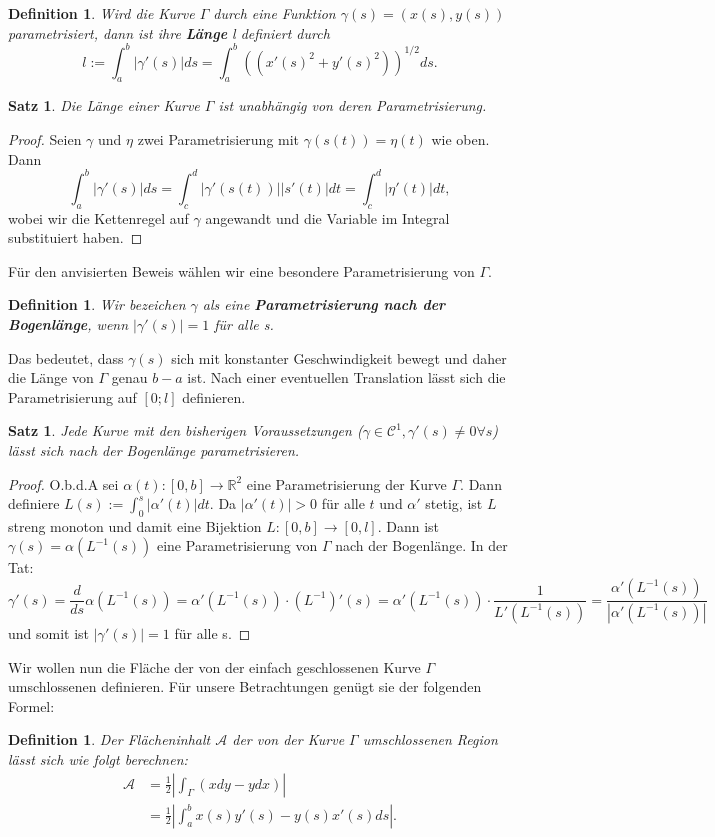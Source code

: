 \documentclass[12pt,a4paper]{article}
\theoremstyle{plain}
\newtheorem{Satz}[Theorem]{Satz}
\newtheorem{Definition}[Theorem]{Definition}
\newcommand{\herv}[1]{{\emph{\textbf{#1}}}}
\newcommand{\R}{\mathbb{R}}
\numberwithin{equation}{section}
\begin{document}
\begin{Definition}
Wird die Kurve $\Gamma$ durch eine Funktion $\gamma(s)=(x(s),y(s))$ parametrisiert, dann ist ihre \herv{Länge} l definiert durch \[
l:=\int_a^b{|\gamma'(s)|ds}=\int_a^b {\left((x'(s)^2+y'(s)^2)\right)^{1/2}ds}.\]
\end{Definition}
\begin{Satz}
Die Länge einer Kurve $\Gamma$ ist unabhängig von deren Parametrisierung.
\end{Satz}
\begin{proof}
Seien $\gamma$ und $\eta$ zwei Parametrisierung mit $\gamma(s(t))=\eta(t)$ wie oben. Dann \[ \int_a^b{|\gamma'(s)|ds} = \int_c^d{|\gamma'(s(t))||s'(t)|dt} = \int_c^d{|\eta'(t)|dt} ,\] wobei wir die Kettenregel auf $\gamma$ angewandt und die Variable im Integral substituiert haben.
\end{proof}
Für den anvisierten Beweis wählen wir eine besondere Parametrisierung von $\Gamma$.
\begin{Definition}
Wir bezeichen $\gamma$ als eine \herv{Parametrisierung nach der Bogenlänge}, wenn $|\gamma'(s)|=1$ für alle s.
\end{Definition}
Das bedeutet, dass $\gamma(s)$ sich mit konstanter Geschwindigkeit bewegt und daher die Länge von $\Gamma$ genau $b-a$ ist. Nach einer eventuellen Translation lässt sich die Parametrisierung auf $[0;l]$ definieren.
\begin{Satz}
Jede Kurve mit den bisherigen Voraussetzungen ($\gamma\in\mathcal{C}^1, \gamma'(s)\neq 0 \forall s$) lässt sich nach der Bogenlänge parametrisieren.
\end{Satz}
\begin{proof}
O.b.d.A sei $\alpha(t):[0,b]\rightarrow \R^2$ eine Parametrisierung der Kurve $\Gamma$. Dann definiere $L(s):=\int_0^s{|\alpha'(t)|dt}$. Da $|\alpha'(t)| > 0$ für alle $t$ und $\alpha'$ stetig, ist $L$ streng monoton und damit eine Bijektion $L:[0,b]\rightarrow [0,l]$. Dann ist $\gamma(s)=\alpha(L^{-1}(s))$ eine Parametrisierung von $\Gamma$ nach der Bogenlänge. In der Tat: \[\gamma'(s)=\frac{d}{ds}\alpha(L^{-1}(s))=\alpha'({L^{-1}(s)})\cdot (L^{-1})'(s) = \alpha'(L^{-1}(s))\cdot \frac{1}{L'(L^{-1}(s))}= \frac{\alpha'(L^{-1}(s))}{|\alpha'(L^{-1}(s))|}\] und somit ist $|\gamma'(s)|=1$ für alle s.
\end{proof}
Wir wollen nun die Fläche der von der einfach geschlossenen Kurve $\Gamma$ umschlossenen definieren. Für unsere Betrachtungen genügt sie der folgenden Formel:
\begin{Definition}
Der Flächeninhalt $\mathcal{A}$ der von der Kurve $\Gamma$ umschlossenen Region lässt sich wie folgt berechnen:
\begin{align*}
\mathcal{A}&=\frac{1}{2}\left|\int_\Gamma (x dy -y dx) \right| \\
&= \frac{1}{2}\left|\int_a^b x(s)y'(s)-y(s)x'(s) ds \right| .
\end{align*}
\end{Definition}
\end{document}
